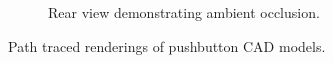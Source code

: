 \begin{figure}[H]
\begin{subfigure}[t]{0.4\textwidth}
        \caption{Rear view demonstrating ambient occlusion.}
        \label{fig:demo-ambient-occlusion}
    \end{subfigure}
    \hspace*{1cm}
    \caption{Path traced renderings of pushbutton \gls{CAD} models.}
    \label{fig:rendering-showcase}
\end{figure}
